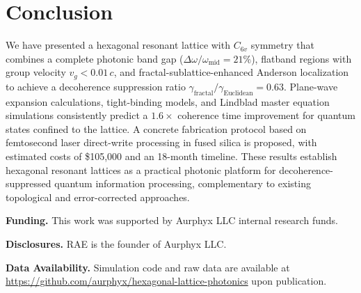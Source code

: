 \documentclass[10pt,letterpaper]{article}
\begin{document}

\section{Conclusion}
\label{sec:conclusion}

We have presented a hexagonal resonant lattice with $C_{6v}$ symmetry that combines a complete photonic band gap ($\Delta\omega/\omega_\mathrm{mid} = 21\%$), flatband regions with group velocity $v_g < 0.01\,c$, and fractal-sublattice-enhanced Anderson localization to achieve a decoherence suppression ratio $\gamma_\mathrm{fractal}/\gamma_\mathrm{Euclidean} = 0.63$. Plane-wave expansion calculations, tight-binding models, and Lindblad master equation simulations consistently predict a $1.6\times$ coherence time improvement for quantum states confined to the lattice. A concrete fabrication protocol based on femtosecond laser direct-write processing in fused silica is proposed, with estimated costs of \$105,000 and an 18-month timeline. These results establish hexagonal resonant lattices as a practical photonic platform for decoherence-suppressed quantum information processing, complementary to existing topological and error-corrected approaches.

\bigskip

\noindent\textbf{Funding.} This work was supported by Aurphyx LLC internal research funds.

\noindent\textbf{Disclosures.} RAE is the founder of Aurphyx LLC.

\noindent\textbf{Data Availability.} Simulation code and raw data are available at \url{https://github.com/aurphyx/hexagonal-lattice-photonics} upon publication.




\end{document}
